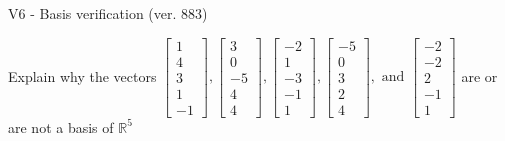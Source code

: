 \begin{exercise}
  \begin{exerciseTitle}V6 - Basis verification (ver. 883)\end{exerciseTitle}
  \begin{exerciseStatement}
    Explain why the vectors \(\left[\begin{array}{r}
1 \\
4 \\
3 \\
1 \\
-1
\end{array}\right] , \left[\begin{array}{r}
3 \\
0 \\
-5 \\
4 \\
4
\end{array}\right] , \left[\begin{array}{r}
-2 \\
1 \\
-3 \\
-1 \\
1
\end{array}\right] , \left[\begin{array}{r}
-5 \\
0 \\
3 \\
2 \\
4
\end{array}\right] , \text{ and } \left[\begin{array}{r}
-2 \\
-2 \\
2 \\
-1 \\
1
\end{array}\right]\) are or are not a basis of \(\mathbb{R}^5\)	



\end{exerciseStatement}
\end{exercise}
